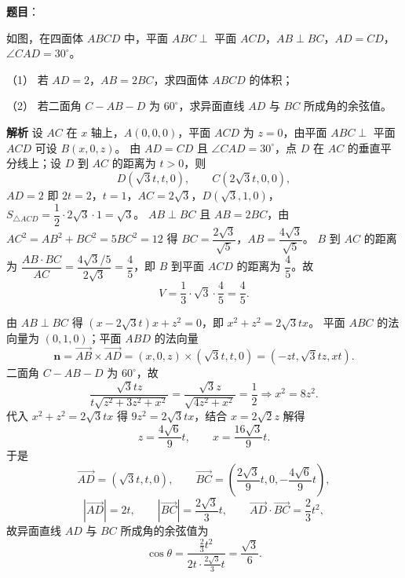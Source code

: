 \begin{answer}

\textbf{题目}：

如图，在四面体 $ABCD$ 中，平面 $ABC\perp$ 平面 $ACD$，$AB\perp BC$，$AD=CD$，$\angle CAD=30^\circ$。

（1） 若 $AD=2$，$AB=2BC$，求四面体 $ABCD$ 的体积；

（2） 若二面角 $C-AB-D$ 为 $60^\circ$，求异面直线 $AD$ 与 $BC$ 所成角的余弦值。
\nopagebreak[4]
\begin{center}\end{center}
\nopagebreak[4]
\textbf{解析}
设 $AC$ 在 $x$ 轴上，$A(0,0,0)$，平面 $ACD$ 为 $z=0$，由平面 $ABC\perp$ 平面 $ACD$ 可设 $B(x,0,z)$。
由 $AD=CD$ 且 $\angle CAD=30^\circ$，点 $D$ 在 $AC$ 的垂直平分线上；设 $D$ 到 $AC$ 的距离为 $t>0$，则
\nopagebreak[4]
\[D(\sqrt3t,t,0),\qquad C(2\sqrt3t,0,0),\]
$AD=2$ 即 $2t=2$，$t=1$，$AC=2\sqrt3$，$D(\sqrt3,1,0)$，$S_{\triangle ACD}=\dfrac12\cdot2\sqrt3\cdot1=\sqrt3$。
$AB\perp BC$ 且 $AB=2BC$，由 $AC^2=AB^2+BC^2=5BC^2=12$ 得 $BC=\dfrac{2\sqrt3}{\sqrt5}$，$AB=\dfrac{4\sqrt3}{\sqrt5}$。
$B$ 到 $AC$ 的距离为 $\dfrac{AB\cdot BC}{AC}=\dfrac{4\sqrt3/5}{2\sqrt3}=\dfrac45$，即 $B$ 到平面 $ACD$ 的距离为 $\dfrac45$。故
\nopagebreak[4]
\[V=\frac13\cdot\sqrt3\cdot\frac45=\frac45.\]

由 $AB\perp BC$ 得 $(x-2\sqrt3t)x+z^2=0$，即 $x^2+z^2=2\sqrt3tx$。
平面 $ABC$ 的法向量为 $(0,1,0)$；平面 $ABD$ 的法向量
\nopagebreak[4]
\[\boldsymbol n=\overrightarrow{AB}\times\overrightarrow{AD}=(x,0,z)\times(\sqrt3t,t,0)=(-zt,\sqrt3tz,xt).\]
二面角 $C-AB-D$ 为 $60^\circ$，故
\nopagebreak[4]
\[\frac{\sqrt3tz}{t\sqrt{z^2+3z^2+x^2}}=\frac{\sqrt3z}{\sqrt{4z^2+x^2}}=\frac12\Longrightarrow x^2=8z^2.\]
代入 $x^2+z^2=2\sqrt3tx$ 得 $9z^2=2\sqrt3tx$，结合 $x=2\sqrt2z$ 解得
\nopagebreak[4]
\[z=\frac{4\sqrt6}9t,\qquad x=\frac{16\sqrt3}9t.\]
于是
\nopagebreak[4]
\[\overrightarrow{AD}=(\sqrt3t,t,0),\qquad \overrightarrow{BC}=\left(\frac{2\sqrt3}9t,0,-\frac{4\sqrt6}9t\right),\]
\nopagebreak[4]
\[|\overrightarrow{AD}|=2t,\qquad |\overrightarrow{BC}|=\frac{2\sqrt3}3t,\qquad \overrightarrow{AD}\cdot\overrightarrow{BC}=\frac23t^2,\]
故异面直线 $AD$ 与 $BC$ 所成角的余弦值为
\nopagebreak[4]
\[\cos\theta=\frac{\frac23t^2}{2t\cdot\frac{2\sqrt3}3t}=\frac{\sqrt3}6.\]



\end{answer}
